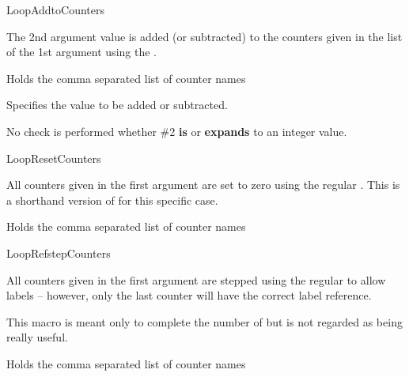 \documentclass[12pt,a4paper,oneside]{article}
\makeatletter
\newcommand{\chdocextractversion}[1]{%
  \@nameuse{#1}%
}
\newcommand{\CHDocNew}[1]{%
  \tcbdocmarginnote[doclang/new={N},
  colframe=blue,
  halign=left,
  colback={blue!20!white},
  fontupper={\tiny}
  ]{%
    \chdocextractversion{xassoccntversion#1}%
  }%
}
\makeatother
\begin{document}
\begin{docCommand}[before={\CHDocNew{0.7}}]{LoopAddtoCounters}{}

The 2nd argument value is added (or subtracted) to the counters given in the list of the 1st argument using the .

\begin{codeoptionsenum}
  \item {} 
    Holds the comma separated list of counter names
  \item {}
    Specifies the value to be added or subtracted.

    No check is performed whether \#2 \textbf{is} or \textbf{expands} to an integer value. 
  \end{codeoptionsenum}

\end{docCommand}


\begin{docCommand}[before={\CHDocNew{0.7}}]{LoopResetCounters}{}


All counters given in the first argument are set to zero using the regular . This is a shorthand version of  for this specific case. 


\begin{codeoptionsenum}
  \item {} 
    Holds the comma separated list of counter names
  \end{codeoptionsenum}

\end{docCommand}


\begin{docCommand}[before={\CHDocNew{0.7}}]{LoopRefstepCounters}{} 

All counters given in the first argument are stepped using the regular  to allow labels -- however, only the last counter will have the correct label reference.

\begin{marker}
  This macro is meant only to complete the number of  but is not regarded as being really useful. 
\end{marker}

\begin{codeoptionsenum}
  \item {} 
    Holds the comma separated list of counter names
  \end{codeoptionsenum}

\end{docCommand}
\end{document}
